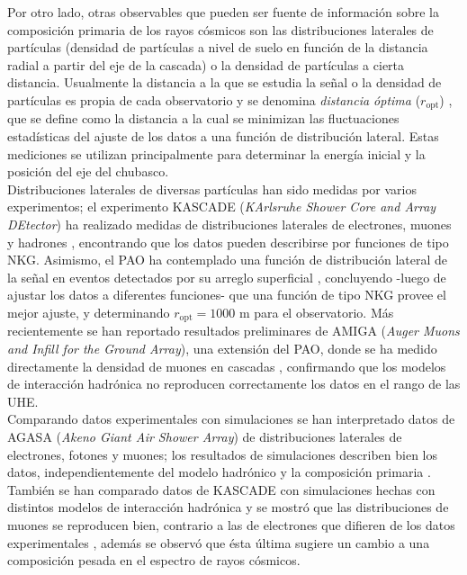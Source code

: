 Por otro lado, otras observables que pueden ser fuente de información sobre la composición primaria de los rayos cósmicos son las distribuciones laterales de partículas (densidad de partículas a nivel de suelo en función de la distancia radial a partir del eje de la cascada) o la densidad de partículas a cierta distancia. Usualmente la distancia a la que se estudia la señal o la densidad de partículas es propia de cada observatorio y se denomina \textit{distancia óptima} ($r_{\text{opt}}$) \cite{Newton2007}, que se define como la distancia a la cual se minimizan las fluctuaciones estadísticas del ajuste de los datos a una función de distribución lateral. Estas mediciones se utilizan principalmente para determinar la energía inicial y la posición del eje del chubasco. \\

Distribuciones laterales de diversas partículas han sido medidas por varios experimentos; el experimento KASCADE (\textit{KArlsruhe Shower Core and Array DEtector}) ha realizado medidas de distribuciones laterales de electrones, muones y hadrones \cite{Antoni2001}, encontrando que los datos pueden describirse por funciones de tipo NKG. Asimismo, el PAO ha contemplado una función de distribución lateral de la señal en eventos detectados por su arreglo superficial \cite{Barnhill2005}, concluyendo -luego de ajustar los datos a diferentes funciones- que una función de tipo NKG provee el mejor ajuste, y determinando $r_{\text{opt}} = 1000$ m para el observatorio. Más recientemente se han reportado resultados preliminares de AMIGA (\textit{Auger Muons and Infill for the Ground Array}), una extensión del PAO, donde se ha medido directamente la densidad de muones en cascadas \cite{Muller2019}, confirmando que los modelos de interacción hadrónica no reproducen correctamente los datos en el rango de las UHE. \\

Comparando datos experimentales con simulaciones se han interpretado datos de AGASA (\textit{Akeno Giant Air Shower Array}) de distribuciones laterales de electrones, fotones y muones; los resultados de simulaciones describen bien los datos, independientemente del modelo hadrónico y la composición primaria \cite{Nagano2000}. Tambi\'en se han comparado datos de KASCADE con simulaciones hechas con distintos modelos de interacción hadrónica y se mostró que las distribuciones de muones se reproducen bien, contrario a las de electrones que difieren de los datos experimentales \cite{Apel2005}, además se observó que ésta última sugiere un cambio a una composición pesada en el espectro de rayos cósmicos. \\

